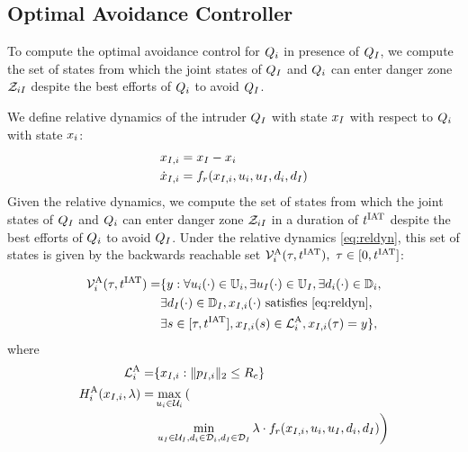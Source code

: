 \subsection{Optimal Avoidance Controller} \label{sec:intruder_avoid}
To compute the optimal avoidance control for $Q_i$ in presence of $Q_{I}$, we compute the set of states from which the joint states of $Q_{I}$ and $Q_i$ can enter danger zone $\mathcal{Z}_{iI}$ despite the best efforts of $Q_i$ to avoid $Q_{I}$. 

We define relative dynamics of the intruder $Q_{I}$ with state $x_I$ with respect to $Q_i$ with state $x_i$:
\begin{equation}
\label{eq:reldyn}
\begin{aligned}
\state_{\intr, i} &= \state_\intr - \state_i \\
\dot \state_{\intr, i} &= f_r(\state_{\intr, i}, \ctrl_i, \ctrl_\intr, \dstb_i, \dstb_\intr)
\end{aligned}
\end{equation}
Given the relative dynamics, we compute the set of states from which the joint states of $Q_{I}$ and $Q_{i}$ can enter danger zone $\mathcal{Z}_{iI}$ in a duration of $t^\text{IAT}$ despite the best efforts of $Q_i$ to avoid $Q_{I}$. Under the relative dynamics \eqref{eq:reldyn}, this set of states is given by the backwards reachable set $\mathcal{V}^{\text{A}}_i(\tau, t^\text{IAT}),~ \tau \in [0, t^\text{IAT}]$:

\begin{equation} \label{eqn:avoidBRS}
\begin{aligned}
\brs^{\text{A}}_{i}(\tau, \iat) = & \{y: \forall \ctrl_i(\cdot) \in \cfset_i, \exists \ctrl_\intr(\cdot) \in \cfset_\intr, \exists \dstb_i(\cdot) \in \dfset_i, \\
& \exists \dstb_\intr(\cdot) \in \dfset_\intr, \state_{\intr, i}(\cdot) \text{ satisfies \eqref{eq:reldyn}},\\
& \exists s \in [\tau, \iat], \state_{\intr, i}(s) \in \targetset^{\text{A}}_{i}, \state_{\intr, i}(\tau) = y\},
\end{aligned}
\end{equation}
where 
\begin{equation}
\begin{aligned}
\mathcal{L}^{\text{A}}_{i} = & \{x_{I, i}: \|p_{I, i}\|_2 \le R_c\} \\
H^{\text{A}}_{i}(x_{I, i}, \lambda) = & \max_{u_i \in \mathcal{U}_i} \left( \right.\\
&\left. \min_{u_I \in \mathcal{U}_I, d_i \in \mathcal{D}_i, d_I \in \mathcal{D}_I} \lambda \cdot f_r(x_{I, i}, u_i, u_I, d_i, d_I) \right)
\end{aligned}
\end{equation}

